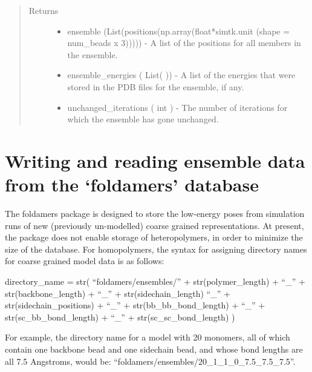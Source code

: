 \documentclass[letterpaper,12pt,english,openany,oneside]{sphinxmanual}
\begin{document}
\begin{fulllineitems}
\begin{quote}
\begin{description}
\begin{itemize}
\end{itemize}

\item[{Returns}] \leavevmode
\begin{itemize}
\item {} 
ensemble (List(positions(np.array(float*simtk.unit (shape = num\_beads x 3))))) - A list of the positions for all members in the ensemble.

\item {} 
ensemble\_energies ( List( )) - A list of the energies that were stored in the PDB files for the ensemble, if any.

\item {} 
unchanged\_iterations ( int ) - The number of iterations for which the ensemble has gone unchanged.

\end{itemize}


\end{description}\end{quote}

\end{fulllineitems}


\newpage


\section{Writing and reading ensemble data from the ‘foldamers’ database}
\label{\detokenize{ensembles:writing-and-reading-ensemble-data-from-the-foldamers-database}}
The foldamers package is designed to store the low-energy poses from simulation runs of new (previously un-modelled) coarse grained representations.  At present, the package does not enable storage of heteropolymers, in order to minimize the size of the database.  For homopolymers, the syntax for assigning directory names for coarse grained model data is as follows:

directory\_name = str( “foldamers/ensembles/” + str(polymer\_length) + “\_” + str(backbone\_length) + “\_” + str(sidechain\_length) “\_” + str(sidechain\_positions) + “\_” + str(bb\_bb\_bond\_length) + “\_” + str(sc\_bb\_bond\_length) + “\_” + str(sc\_sc\_bond\_length) )

For example, the directory name for a model with 20 monomers, all of which contain one backbone bead and one sidechain bead, and whose bond lengths are all 7.5 Angstroms, would be: “foldamers/ensembles/20\_1\_1\_0\_7.5\_7.5\_7.5”.
\end{document}
